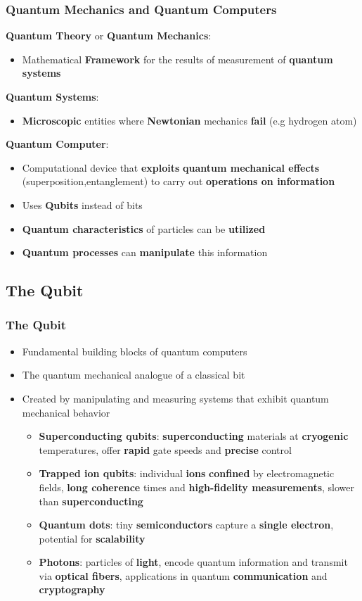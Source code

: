 \documentclass{beamer}
\begin{document}
\begin{frame}
	\frametitle{Quantum Mechanics and Quantum Computers}
	\textbf{Quantum Theory} or \textbf{Quantum Mechanics}:
	\begin{itemize}
		\item Mathematical \textbf{Framework} for the results of measurement of \textbf{quantum systems}
	\end{itemize}
	\textbf{Quantum Systems}:
	\begin{itemize}
		\item\textbf{Microscopic} entities where \textbf{Newtonian} mechanics \textbf{fail} (e.g hydrogen atom)
	\end{itemize}
	\textbf{Quantum Computer}:
	\begin{itemize}
	\item Computational device that \textbf{exploits} \textbf{quantum mechanical effects} (superposition,entanglement) to carry out \textbf{operations on information}
	\item Uses \textbf{Qubits} instead of bits
	\item \textbf{Quantum characteristics} of particles can be \textbf{utilized}
	\item \textbf{Quantum processes} can \textbf{manipulate} this information
	\end{itemize}	
\end{frame}


\subsection{The Qubit}

\begin{frame}
	\frametitle{The Qubit}
	\begin{itemize}
	\item Fundamental building blocks of quantum computers
	\item The quantum mechanical analogue of a classical bit
	\item Created by manipulating and measuring systems that exhibit quantum mechanical behavior
	\begin{itemize}
		\item \textbf{Superconducting qubits}: \textbf{superconducting} materials at \textbf{cryogenic} temperatures, offer \textbf{rapid} gate speeds and \textbf{precise} control
		\item \textbf{Trapped ion qubits}: individual \textbf{ions} \textbf{confined} by electromagnetic fields, \textbf{long coherence} times and \textbf{high-fidelity measurements}, slower than \textbf{superconducting}
		\item \textbf{Quantum dots}: tiny \textbf{semiconductors} capture a \textbf{single electron}, potential for \textbf{scalability}
		\item \textbf{Photons}: particles of \textbf{light}, encode quantum information and transmit via \textbf{optical fibers}, applications in quantum \textbf{communication} and \textbf{cryptography}
	\end{itemize}
	
	\end{itemize}

\end{frame}
\end{document}
